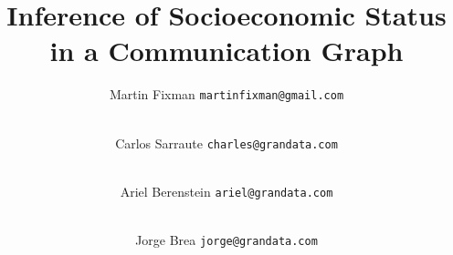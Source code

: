 



\title{Inference of Socioeconomic Status in a Communication Graph}
\author{
	Martin Fixman
	\texttt{martinfixman@gmail.com}
	\and \\
	Carlos Sarraute
	\texttt{charles@grandata.com}
	\and \\
	Ariel Berenstein
	\texttt{ariel@grandata.com}
	\and \\
	Jorge Brea
	\texttt{jorge@grandata.com}
}
\maketitle

\begin{abstract}
	
\end{abstract}




\newpage


{}


